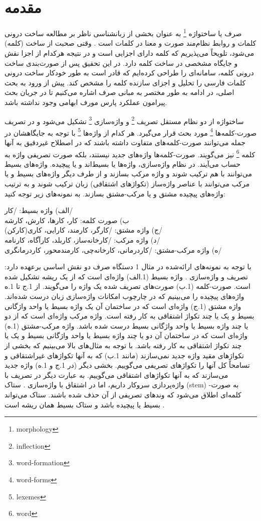 \documentclass[12pt,onecolumn,a4paper]{article}
\begin{document}
    \section{مقدمه}
    صرف یا ساختواژه \footnote{morphology} به عنوان بخشی از زبان‏شناسی ناظر بر مطالعه ساخت درونی کلمات و روابط نظام‌مند صورت و معنا در کلمات است  . وقتی صحبت از ساخت (کلمه) می‌شود، تلویحاً می‌پذیریم که کلمه دارای اجزایی است و در نتیجه هرکدام از اجزا نقش و جایگاه مشخصی در ساخت کلمه دارد. در این تحقیق پس از صورت‌بندی ساخت درونی کلمه، سامانه‌ای را طراحی کرده‌ایم که قادر است به طور خودکار ساخت درونی کلمات فارسی را تحلیل و اجزای سازنده کلمه را مشخص کند. پیش از ورود به بحث اصلی، در ادامه به طور مختصر به مبانی صرف اشاره می‌کنیم تا در جریان بحث پیرامون عملکرد پارس مورف ابهامی وجود نداشته باشد.
    \par
    ساختواژه از دو نظام مستقل تصریف \footnote{inflection} و واژه‌سازی \footnote{word-formation} تشکیل می‌شود و در تصریف صورت-کلمه‌ها \footnote{word-forms} مورد بحث قرار می‌گیرد. هر کدام از واژه‌ها \footnote{lexemes} با توجه به جایگاهشان در جمله می‌توانند صورت-کلمه‌های متفاوت داشته باشند که در اصطلاح غیردقیق به آنها کلمه \footnote{word} نیز می‌گویند. صورت-کلمه‌ها واژه‌های جدید نیستند، بلکه صورت تصریفی واژه‌ به حساب می‌آیند. در نظام واژه‌سازی، واژه‌ها یا بسیط‌اند و یا پیچیده. واژه‌های بسیط می‌توانند با هم ترکیب شوند و واژه مرکب بسازند و از طرف دیگر واژه‌های بسیط و یا مرکب می‌توانند با عناصر واژه‌ساز (تکواژهای اشتقاقی) زبان ترکیب شوند و به ترتیب واژه‌های پیچیده مشتق و یا مرکب-مشتق بسازند. به نمونه‌های زیر توجه کنید:
    \par\noindent
    الف) واژه بسیط: /کار/ \\
    ب) صورت کلمه: کار، کارها، کارش، کارشه \\
    ج) واژه مشتق: /کارگر، کارمند، کارایی، کاری(کارکن)/ \\
    د) واژه مرکب: /کارخانه‌ساز، کاربلد، کارآگاه، کارنامه/ \\
    ه) واژه مرکب-مشتق: /کاردرمانی، کارخانه‌چی، کارمندمحور، کاردرمانگری/ \\
    \par
    با توجه به نمونه‌های ارائه‌شده در مثال 1 دستگاه صرف دو نقش اساسی برعهده دارد: تصریف و واژه‌‌سازی {\mfo\citep{Taba82}}. واژه بسیط (1.الف) واژه‌ای است که از یک ریشه تشکیل شده است. صورت-کلمه (1.ب) صورت‌های تصریف شده یک واژه را می‌گویند. از 1.ج تا 1.ه واژه‌های پیچیده را می‌بینیم که در چارچوب امکانات واژه‌سازی زبان درست شده‌اند. واژه مشتق (1.ج) واژه‌ای است که در ساختمان آن یک واژه بسیط یا واحد واژگانی بسیط و یک یا چند تکواژ اشتقاقی به کار رفته است. واژه مرکب واژه‌ای است که از دو یا چند واژه بسیط یا واحد واژگانی بسیط درست شده باشد. واژه مرکب-مشتق (1.ه) واژه‌ای است که در ساختمان آن دو یا چند واژه بسیط یا واحد واژگانی بسیط و یک یا چند تکواژ اشتقاقی به کار رفته باشد. با توجه به مثال‌های بالا می‌بینیم که بخشی از تکواژهای مقید واژه جدید نمی‌سازند (مانند 1.ب) که به آنها تکواژهای غیراشتقاقی و تسامحاً کل آنها را تکواژهای تصریفی می‌گوییم. بخشی دیگر (در 1.ج و 1.ه) واژه جدید می‌سازند که به آنها تکواژهای اشتقاقی می‌گوییم. به عبارت دیگر در تصریف با واژه‌پردازی سروکار داریم، اما در اشتقاق با واژه‌سازی {\mfo\citep{Taba76}}. ستاک (stem) به صورت-کلمه‌ای اطلاق می‌شود که وندهای تصریفی از آن حذف شده باشند. ستاک می‌تواند بسیط یا پیچیده باشد و ستاک بسیط همان ریشه است .
\end{document}
